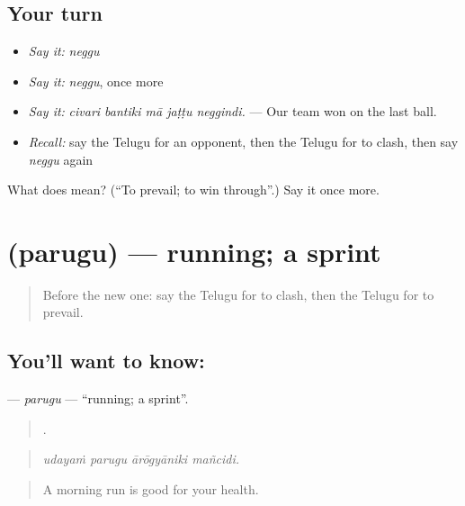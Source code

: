 \subsection*{Your turn}
\begin{itemize}
\raggedright
  \item \emph{Say it:} \emph{neggu}
  \item \emph{Say it:} \emph{neggu}, once more
  \item \emph{Say it:} \emph{civari bantiki mā jaṭṭu neggindi.} — Our team won on the last ball.
  \item \emph{Recall:} say the Telugu for an opponent, then the Telugu for to clash, then say \emph{neggu} again
\end{itemize}

\begin{tcolorbox}[breakable,colback=teal!4,colframe=teal!35!black,title={Before you move on}]
What does  mean? (\textquotedblleft{}To prevail; to win through\textquotedblright{}.) Say it once more.
\end{tcolorbox}
\section[\texorpdfstring{\te{పరుగు} (parugu)}{పరుగు (parugu)}]{ (parugu) — running; a sprint}

\label{lesson:TE-C544-parugu}



\begin{quote}
Before the new one: say the Telugu for to clash, then the Telugu for to prevail.
\end{quote}

\subsection*{You'll want to know: }
\textbf{} — \emph{parugu} — \textquotedblleft{}running; a sprint\textquotedblright{}.

\begin{quote}
   .
\end{quote}

\begin{quote}
\emph{udayaṁ parugu ārōgyāniki mañcidi.}
\end{quote}

\begin{quote}
A morning run is good for your health.
\end{quote}

